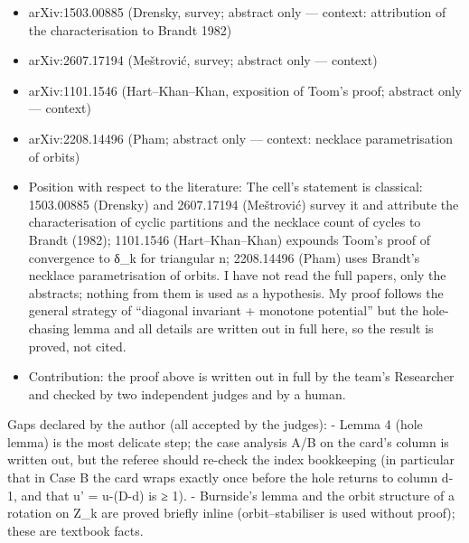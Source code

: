 \begin{itemize}
\tightlist
\item
  arXiv:1503.00885 (Drensky, survey; abstract only --- context:
  attribution of the characterisation to Brandt 1982)
\item
  arXiv:2607.17194 (Meštrović, survey; abstract only --- context)
\item
  arXiv:1101.1546 (Hart--Khan--Khan, exposition of Toom's proof;
  abstract only --- context)
\item
  arXiv:2208.14496 (Pham; abstract only --- context: necklace
  parametrisation of orbits)
\item
  Position with respect to the literature: The cell's statement is
  classical: 1503.00885 (Drensky) and 2607.17194 (Meštrović) survey it
  and attribute the characterisation of cyclic partitions and the
  necklace count of cycles to Brandt (1982); 1101.1546
  (Hart--Khan--Khan) expounds Toom's proof of convergence to δ\_k for
  triangular n; 2208.14496 (Pham) uses Brandt's necklace parametrisation
  of orbits. I have not read the full papers, only the abstracts;
  nothing from them is used as a hypothesis. My proof follows the
  general strategy of ``diagonal invariant + monotone potential'' but
  the hole-chasing lemma and all details are written out in full here,
  so the result is proved, not cited.
\item
  Contribution: the proof above is written out in full by the team's
  Researcher and checked by two independent judges and by a human.
\end{itemize}


Gaps declared by the author (all accepted by the judges): - Lemma 4
(hole lemma) is the most delicate step; the case analysis A/B on the
card's column is written out, but the referee should re-check the index
bookkeeping (in particular that in Case B the card wraps exactly once
before the hole returns to column d-1, and that u' = u-(D-d) is ≥ 1). -
Burnside's lemma and the orbit structure of a rotation on Z\_k are
proved briefly inline (orbit--stabiliser is used without proof); these
are textbook facts.

